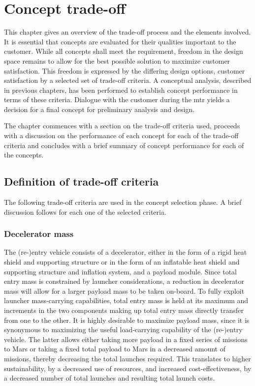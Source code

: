\section{Concept trade-off}
\label{ch:tradeoff}
This chapter gives an overview of the trade-off process and the elements involved. It is essential that concepts are evaluated for their qualities important to the customer. While all concepts shall meet the requirement, freedom in the design space remains to allow for the best possible solution to maximize customer satisfaction. This freedom is expressed by the differing design options, customer satisfaction by a selected set of trade-off criteria. A conceptual analysis, described in previous chapters, has been performed to establish concept performance in terms of these criteria. Dialogue with the customer  during the \acrfull{mtr} yields a decision for a final concept for preliminary analysis and design.

The chapter commences with a section on the trade-off criteria used, proceeds with a discussion on the performance of each concept for each of the trade-off criteria and concludes with a brief summary of concept performance for each of the concepts.

\subsection{Definition of trade-off criteria}
The following trade-off criteria are used in the concept selection phase. A brief discussion follows for each one of the selected criteria.

\subsubsection{Decelerator mass}\label{subsub:decelmass}
The (re-)entry vehicle consists of a decelerator, either in the form of a rigid heat shield and supporting structure or in the form of an inflatable heat shield and supporting structure and inflation system, and a payload module. Since total entry mass is constrained by launcher considerations, a reduction in decelerator mass will allow for a larger payload mass to be taken on-board. To fully exploit launcher mass-carrying capabilities, total entry mass is held at its maximum and increments in the two components making up total entry mass directly transfer from one to the other. It is highly desirable to maximize payload mass, since it is synonymous to maximizing the useful load-carrying capability of the (re-)entry vehicle. The latter allows either taking more payload in a fixed series of missions to Mars or taking a fixed total payload to Mars in a decreased amount of missions, thereby decreasing the total launches required. This translates to higher sustainability, by a decreased use of resources, and increased cost-effectiveness, by a decreased number of total launches and resulting total launch costs.

